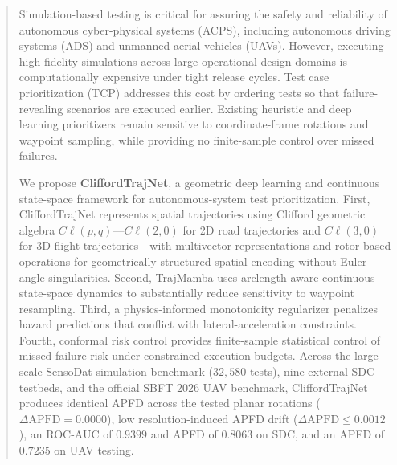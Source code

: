 \documentclass[runningheads]{llncs}
\begin{document}
\begin{abstract}
Simulation-based testing is critical for assuring the safety and reliability of
autonomous cyber-physical systems (ACPS), including autonomous driving systems
(ADS) and unmanned aerial vehicles (UAVs). However, executing high-fidelity
simulations across large operational design domains is computationally expensive
under tight release cycles. Test case prioritization (TCP) addresses this cost by
ordering tests so that failure-revealing scenarios are executed earlier. Existing
heuristic and deep learning prioritizers remain sensitive to coordinate-frame
rotations and waypoint sampling, while providing no finite-sample control over
missed failures.

We propose \textbf{CliffordTrajNet}, a geometric deep learning and continuous
state-space framework for autonomous-system test prioritization. First,
CliffordTrajNet represents spatial trajectories using Clifford geometric algebra
$C\ell(p,q)$---$C\ell(2,0)$ for 2D road trajectories and $C\ell(3,0)$ for 3D
flight trajectories---with multivector representations and rotor-based
operations for geometrically structured spatial encoding without Euler-angle
singularities. Second, TrajMamba uses arclength-aware continuous state-space
dynamics to substantially reduce sensitivity to waypoint resampling. Third, a
physics-informed monotonicity regularizer penalizes hazard predictions that
conflict with lateral-acceleration constraints. Fourth, conformal risk control
provides finite-sample statistical control of missed-failure risk under
constrained execution budgets. Across the large-scale SensoDat simulation
benchmark ($32{,}580$ tests), nine external SDC testbeds, and the official SBFT
2026 UAV benchmark, CliffordTrajNet produces identical APFD across the tested
planar rotations ($\Delta\mathrm{APFD}=0.0000$), low resolution-induced APFD
drift ($\Delta\mathrm{APFD}\leq0.0012$), an ROC-AUC of $0.9399$ and APFD of
$0.8063$ on SDC, and an APFD of $0.7235$ on UAV testing.

\end{abstract}












\end{document}

